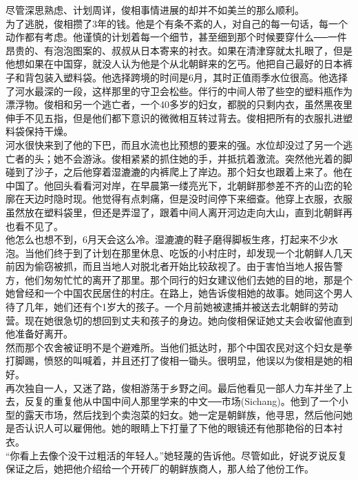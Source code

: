 尽管深思熟虑、计划周详，俊相事情进展的却并不如美兰的那么顺利。\\

为了逃脱，俊相攒了3年的钱。他是个有条不紊的人，对自己的每一句话，每一个动作都有考虑。他谨慎的计划着每一个细节，甚至细到那个时候要穿什么──一件昂贵的、有泡泡图案的、叔叔从日本寄来的衬衣。如果在清津穿就太扎眼了，但是他想如果在中国穿，就没人认为他是个从北朝鲜来的乞丐。他把自己最好的日本裤子和背包装入塑料袋。他选择跨境的时间是6月，其时正值雨季水位很高。他选择了河水最深的一段，这样那里的守卫会松些。伴行的中间人带了些空的塑料瓶作为漂浮物。俊相和另一个逃亡者，一个40多岁的妇女，都脱的只剩内衣，虽然黑夜里伸手不见五指，但是他们都下意识的微微相互转过背去。俊相把所有的衣服扎进塑料袋保持干燥。\\

河水很快来到了他的下巴，而且水流也比预想的要来的强。水位却没过了另一个逃亡者的头；她不会游泳。俊相紧紧的抓住她的手，并抵抗着激流。突然他光着的脚碰到了沙子，之后他穿着湿漉漉的内裤爬上了岸边。那个妇女也跟着上来了。他在中国了。他回头看看河对岸，在早晨第一缕亮光下，北朝鲜那参差不齐的山峦的轮廓在天边时隐时现。他觉得有点刺痛，但是没时间停下来细查。他穿上衣服，衣服虽然放在塑料袋里，但还是弄湿了，跟着中间人离开河边走向大山，直到北朝鲜再也看不见了。\\

他怎么也想不到，6月天会这么冷。湿漉漉的鞋子磨得脚板生疼，打起来不少水泡。当他们终于到了计划在那里休息、吃饭的小村庄时，却发现一个北朝鲜人几天前因为偷窃被抓，而且当地人对脱北者开始比较敌视了。由于害怕当地人报告警方，他们匆匆忙忙的离开了那里。那个同行的妇女建议他们去她的目的地，那是个她曾经和一个中国农民居住的村庄。在路上，她告诉俊相她的故事。她同这个男人待了几年，她们还有个1岁大的孩子。一个月前她被逮捕并被送去北朝鲜的劳动营。现在她很急切的想回到丈夫和孩子的身边。她向俊相保证她丈夫会收留他直到他准备好离开。\\

然而那个农舍被证明不是个避难所。当他们抵达时，那个中国农民对这个妇女是拳打脚踢，愤怒的叫喊着，并且还打了俊相一锄头。很明显，他误以为俊相是她的相好。\\

再次独自一人，又迷了路，俊相游荡于乡野之间。最后他看见一部人力车并坐了上去，反复的重复他从中国中间人那里学来的中文──市场(Sichang)。他到了一个小型的露天市场，然后找到个卖泡菜的妇女。她一定是朝鲜族，他寻思，然后他问她是否认识人可以雇佣他。她的眼睛上下打量了下他的眼镜还有他那艳俗的日本衬衣。\\

“你看上去像个没干过粗活的年轻人。”她轻蔑的告诉他。尽管如此，好说歹说反复保证之后，她把他介绍给一个开砖厂的朝鲜族商人，那人给了他份工作。\\

